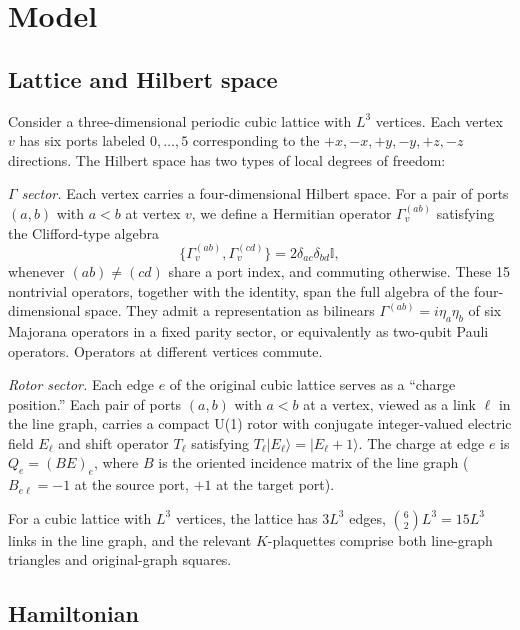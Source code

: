 \documentclass[aps,prb,twocolumn,superscriptaddress,showpacs]{revtex4-2}
\begin{document}
\section{Model}
\label{sec:model}

\subsection{Lattice and Hilbert space}

Consider a three-dimensional periodic cubic lattice with $L^3$ vertices.
Each vertex $v$ has six ports labeled $0,\ldots,5$ corresponding to the
$+x,-x,+y,-y,+z,-z$ directions. The Hilbert space has two types of
local degrees of freedom:

\textit{$\Gamma$ sector.} Each vertex carries a four-dimensional Hilbert
space. For a pair of ports $(a,b)$ with $a<b$ at vertex $v$, we define
a Hermitian operator $\Gamma_v^{(ab)}$ satisfying the Clifford-type
algebra
\begin{equation}
\{\Gamma_v^{(ab)},\Gamma_v^{(cd)}\} = 2\delta_{ac}\delta_{bd}\mathbb{I},
\end{equation}
whenever $(ab)\neq(cd)$ share a port index, and commuting otherwise.
These 15 nontrivial operators, together with the identity, span the
full algebra of the four-dimensional space. They admit a representation
as bilinears $\Gamma^{(ab)}=i\eta_a\eta_b$ of six Majorana operators
in a fixed parity sector, or equivalently as two-qubit Pauli operators.
Operators at different vertices commute.

\textit{Rotor sector.} Each edge $e$ of the original cubic lattice
serves as a ``charge position.'' Each pair of ports $(a,b)$ with
$a<b$ at a vertex, viewed as a link $\ell$ in the line graph, carries
a compact U(1) rotor with conjugate integer-valued electric field
$E_\ell$ and shift operator $T_\ell$ satisfying $T_\ell|E_\ell\rangle
= |E_\ell+1\rangle$. The charge at edge $e$ is $Q_e=(BE)_e$, where
$B$ is the oriented incidence matrix of the line graph ($B_{e\ell}=
-1$ at the source port, $+1$ at the target port).

For a cubic lattice with $L^3$ vertices, the lattice has $3L^3$ edges,
$\binom{6}{2}L^3=15L^3$ links in the line graph, and the relevant
$K$-plaquettes comprise both line-graph triangles and original-graph
squares.

\subsection{Hamiltonian}
\end{document}
